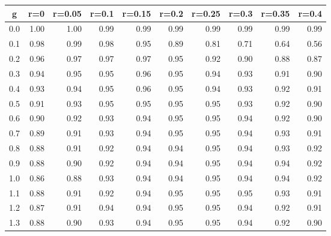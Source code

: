 %
\begin{table}[!tbp]
 \begin{center}
 \begin{tabular}{rrrrrrrrrr}\hline\hline
\multicolumn{1}{c}{g}&\multicolumn{1}{c}{r=0}&\multicolumn{1}{c}{r=0.05}&\multicolumn{1}{c}{r=0.1}&\multicolumn{1}{c}{r=0.15}&\multicolumn{1}{c}{r=0.2}&\multicolumn{1}{c}{r=0.25}&\multicolumn{1}{c}{r=0.3}&\multicolumn{1}{c}{r=0.35}&\multicolumn{1}{c}{r=0.4}\tabularnewline
\hline
0.0&1.00&1.00&0.99&0.99&0.99&0.99&0.99&0.99&0.99\tabularnewline
0.1&0.98&0.99&0.98&0.95&0.89&0.81&0.71&0.64&0.56\tabularnewline
0.2&0.96&0.97&0.97&0.97&0.95&0.92&0.90&0.88&0.87\tabularnewline
0.3&0.94&0.95&0.95&0.96&0.95&0.94&0.93&0.91&0.90\tabularnewline
0.4&0.93&0.94&0.95&0.96&0.95&0.94&0.93&0.92&0.91\tabularnewline
0.5&0.91&0.93&0.95&0.95&0.95&0.95&0.93&0.92&0.90\tabularnewline
0.6&0.90&0.92&0.93&0.94&0.95&0.95&0.94&0.92&0.90\tabularnewline
0.7&0.89&0.91&0.93&0.94&0.95&0.95&0.94&0.93&0.91\tabularnewline
0.8&0.88&0.91&0.92&0.94&0.94&0.95&0.94&0.93&0.92\tabularnewline
0.9&0.88&0.90&0.92&0.94&0.94&0.95&0.94&0.94&0.92\tabularnewline
1.0&0.86&0.88&0.93&0.94&0.94&0.95&0.94&0.94&0.92\tabularnewline
1.1&0.88&0.91&0.92&0.94&0.95&0.95&0.95&0.93&0.91\tabularnewline
1.2&0.87&0.91&0.94&0.94&0.95&0.95&0.94&0.92&0.91\tabularnewline
1.3&0.88&0.90&0.93&0.94&0.95&0.95&0.94&0.92&0.90\tabularnewline
\hline
\end{tabular}

\end{center}

\end{table}

